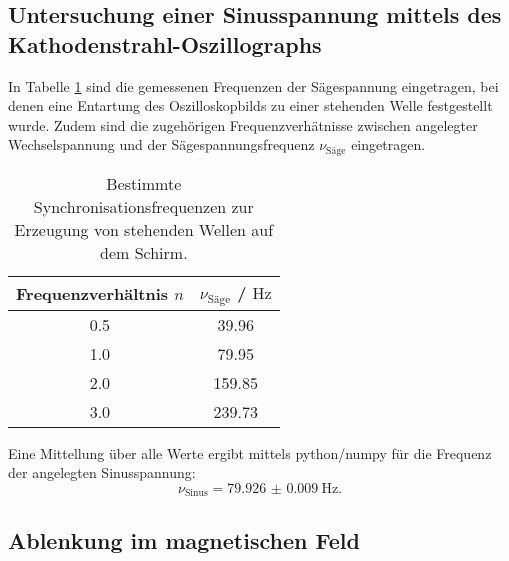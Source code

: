 \subsection{Untersuchung einer Sinusspannung mittels des Kathodenstrahl-Oszillographs}
In Tabelle \ref{tab:saegen} sind die gemessenen Frequenzen der Sägespannung eingetragen, bei denen eine Entartung des Oszilloskopbilds zu einer stehenden Welle festgestellt wurde. Zudem sind die zugehörigen Frequenzverhätnisse zwischen angelegter Wechselspannung und der Sägespannungsfrequenz $\nu_\mathrm{Säge}$ eingetragen.
\begin{table}
	\caption{Bestimmte Synchronisationsfrequenzen zur Erzeugung von stehenden Wellen auf dem Schirm.}
	\label{tab:saegen}
	\centering
	\begin{tabular}{cc}
	\toprule
		Frequenzverhältnis $n$ & $\nu_\mathrm{Säge}$ / $\si{\hertz}$ \\
	\midrule
		0.5 & 39.96 \\
		1.0 & 79.95 \\
		2.0 & 159.85 \\
		3.0 & 239.73 \\
	\bottomrule
	\end{tabular}
\end{table}
Eine Mittellung über alle Werte ergibt mittels python/numpy \cite{numpy} für die Frequenz der angelegten Sinusspannung:
\begin{equation*}
	\nu_\mathrm{Sinus}=\SI{79.926(9)}{\hertz} \text{.}
\end{equation*}




\FloatBarrier
\subsection{Ablenkung im magnetischen Feld}

